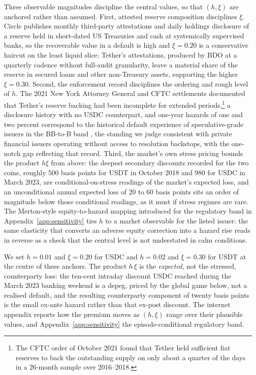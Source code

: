 Three observable magnitudes discipline the central values, so that $(h, \xi)$ are anchored rather than assumed. First, attested reserve composition disciplines $\xi$. Circle publishes monthly third-party attestations and daily holdings disclosure of a reserve held in short-dated US Treasuries and cash at systemically supervised banks, so the recoverable value in a default is high and $\xi = 0.20$ is a conservative haircut on the least liquid slice; Tether's attestations, produced by BDO at a quarterly cadence without full-audit granularity, leave a material share of the reserve in secured loans and other non-Treasury assets, supporting the higher $\xi = 0.30$. Second, the enforcement record disciplines the ordering and rough level of $h$. The 2021 New York Attorney General and CFTC settlements documented that Tether's reserve backing had been incomplete for extended periods,\footnote{The CFTC order of October 2021 found that Tether held sufficient fiat reserves to back the outstanding supply on only about a quarter of the days in a 26-month sample over 2016--2018.} a disclosure history with no USDC counterpart, and one-year hazards of one and two percent correspond to the historical default experience of speculative-grade issuers in the BB-to-B band \citep{sp_default_study_2025}, the standing we judge consistent with private financial issuers operating without access to resolution backstops, with the one-notch gap reflecting that record. Third, the market's own stress pricing bounds the product $h\xi$ from above: the deepest secondary discounts recorded for the two coins, roughly 500 basis points for USDT in October 2018 \citep{lyons_viswanath_natraj_2023} and 980 for USDC in March 2023, are conditional-on-stress readings of the market's expected loss, and an unconditional annual expected loss of 20 to 60 basis points sits an order of magnitude below those conditional readings, as it must if stress regimes are rare. The Merton-style equity-to-hazard mapping introduced for the regulatory band in Appendix~\ref{app:sensitivity} ties $h$ to a market observable for the listed issuer: the same elasticity that converts an adverse equity correction into a hazard rise reads in reverse as a check that the central level is not understated in calm conditions.

We set $h=0.01$ and $\xi=0.20$ for USDC and $h=0.02$ and $\xi=0.30$ for USDT at the centre of these anchors. The product $h\,\xi$ is the \emph{expected}, not the stressed, counterparty loss: the ten-cent intraday discount USDC reached during the March 2023 banking weekend is a depeg, priced by the global game below, not a realised default, and the resulting counterparty component of twenty basis points is the small ex-ante hazard rather than that ex-post discount. The internet appendix reports how the premium moves as $(h,\xi)$ range over their plausible values, and Appendix~\ref{app:sensitivity} the episode-conditional regulatory band.

